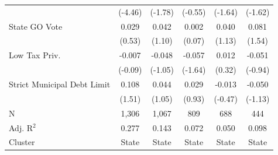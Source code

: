 \begin{tabular*}{\textwidth}{@{\extracolsep{\fill}}lccccc}
                               & (-4.46)       & (-1.78)       & (-0.55)      & (-1.64)      & (-1.62)\\
   State GO Vote               & 0.029          & 0.042          & 0.002         & 0.040         & 0.081\\
                               & (0.53)        & (1.10)        & (0.07)       & (1.13)       & (1.54)\\
   Low Tax Priv.               & -0.007         & -0.048         & -0.057        & 0.012         & -0.051\\
                               & (-0.09)       & (-1.05)       & (-1.64)      & (0.32)       & (-0.94)\\
   Strict Municipal Debt Limit & 0.108          & 0.044          & 0.029         & -0.013        & -0.050\\
                               & (1.51)        & (1.05)        & (0.93)       & (-0.47)      & (-1.13)\\
   \hline
   N                & 1,306          & 1,067          & 809           & 688           & 444\\
   Adj. R$^2$              & 0.277          & 0.143          & 0.072         & 0.050         & 0.098\\
   Cluster              & State & State & State & State & State\\
   \bottomrule
\end{tabular*}
\par\endgroup
